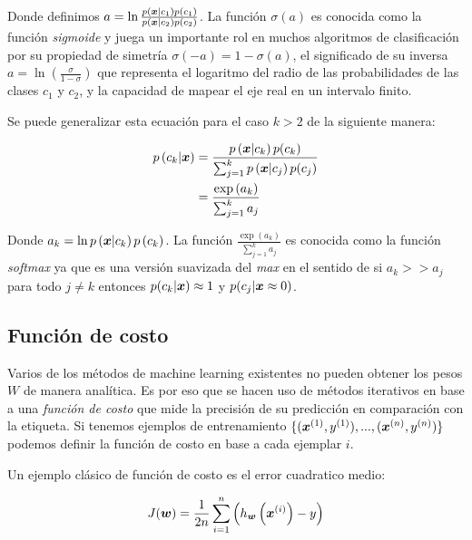 Donde definimos $a = \ln \frac{p\left( \boldsymbol{x} | c_1 \right) p\left( c_1
\right)}{p\left( \boldsymbol{x} | c_2 \right) p\left( c_2 \right)}$. La función
$\sigma(a)$ es conocida como la función \emph{sigmoide} y juega un importante
rol en muchos algoritmos de clasificación por su propiedad de simetría
$\sigma(-a) = 1 - \sigma(a)$, el significado de su inversa $a = \ln \left(
\frac{\sigma}{1 - \sigma} \right)$ que representa el logaritmo del radio de las
probabilidades de las clases $c_1$ y $c_2$, y la capacidad de mapear el eje real
en un intervalo finito.

Se puede generalizar esta ecuación para el caso $k > 2$ de la siguiente manera:

\begin{align*}
    p\left( c_k | \boldsymbol{x} \right) &= \frac{p\left( \boldsymbol{x} | c_k \right)p(c_k)}{
                                                \sum_{j=1}^{k} p\left( \boldsymbol{x} |
                                                c_j \right) p(c_j) } \\
                                       &= \frac{\exp\left( a_k \right)}{\sum_{j=1}^{k} a_j} \\
\end{align*}

Donde $a_k = \ln p\left( \boldsymbol{x} | c_k \right) p\left( c_k \right)$. La función
$\frac{\exp\left( a_k \right)}{\sum_{j=1}^{k} a_j}$ es conocida como la función
\emph{softmax} ya que es una versión suavizada del \emph{max} en el sentido de
si $a_k >> a_j$ para todo $j \neq k$ entonces $p(c_k | \boldsymbol{x}) \approx 1$ y
$p(c_j | \boldsymbol{x} \approx 0)$.

\subsection{Función de costo}

Varios de los métodos de machine learning existentes no pueden obtener los pesos
$W$ de manera analítica. Es por eso que se hacen uso de métodos iterativos en
base a una \emph{función de costo} que mide la precisión de su predicción en
comparación con la etiqueta. Si tenemos ejemplos de entrenamiento
$\{(\boldsymbol{x}^{(1)}, y^{(1)}), ..., (\boldsymbol{x}^{(n)}, y^{(n)})\}$ podemos definir la
función de costo en base a cada ejemplar $i$.

Un ejemplo clásico de función de costo es el error cuadratico medio:

\begin{align*}
    J(\boldsymbol{w}) = \frac{1}{2n} \sum_{i=1}^{n}\left( h_{\boldsymbol{w}}\left( \boldsymbol{x}^{(i)}\right) - y \right)
\end{align*}

